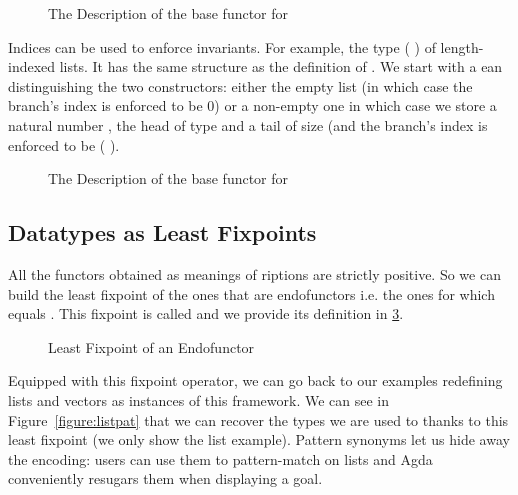 \begin{figure}[h]
\caption{The Description of the base functor for ~}
\label{figure:listD}
\end{figure}

Indices can be used to enforce invariants. For example, the type
({  }) of length-indexed lists. It has the
same structure as the definition of .
We start with a ean distinguishing the two constructors: either
the empty list (in which case the branch's index is enforced to be $0$) or a
non-empty one in which case we store a natural number , the head of type
 and a tail of size  (and the branch's index is enforced to be
( ).

\begin{figure}[h]
\caption{The Description of the base functor for ~~}\label{figure:vecD}
\end{figure}

\subsection{Datatypes as Least Fixpoints}

All the functors obtained as meanings of riptions are strictly
positive. So we can build the least fixpoint of the ones that are
endofunctors i.e. the ones for which  equals . This fixpoint
is called  and we provide its definition in \cref{figure:datamu}.

\begin{figure}[h]
\caption{Least Fixpoint of an Endofunctor}\label{figure:datamu}
\end{figure}

Equipped with this fixpoint operator, we can go back to our examples
redefining lists and vectors as instances of this framework. We can
see in Figure~\ref{figure:listpat} that we can recover the types we are
used to thanks to this least fixpoint (we only show the list example).
%
Pattern synonyms let us hide away the encoding: users can use them
to pattern-match on lists and Agda conveniently resugars them when
displaying a goal.

